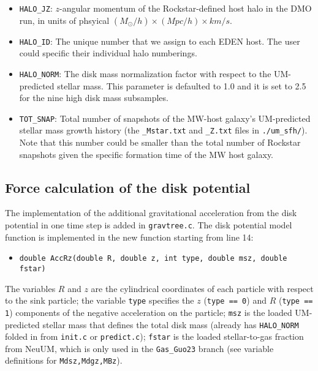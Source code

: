 \documentclass[12pt]{article}
\begin{document}
\begin{itemize}
        \item \texttt{HALO\_JZ}: $z$-angular momentum of the Rockstar-defined host halo in the DMO run, in units of phsyical $(M_{\odot}/h) \times (Mpc/h) \times km/s$.
        \item \texttt{HALO\_ID}: The unique number that we assign to each EDEN host. The user could specific their individual halo numberings.
        \item \texttt{HALO\_NORM}: The disk mass normalization factor with respect to the UM-predicted stellar mass. This parameter is defaulted to 1.0 and it is set to 2.5 for the nine high disk mass subsamples.
        \item \texttt{TOT\_SNAP}: Total number of snapshots of the MW-host galaxy's UM-predicted stellar mass growth history (the \texttt{\_Mstar.txt} and \texttt{\_Z.txt} files in \texttt{./um\_sfh/}). Note that this number could be smaller than the total number of Rockstar snapshots given the specific formation time of the MW host galaxy.
    \end{itemize}

    \subsection{Force calculation of the disk potential}

    The implementation of the additional gravitational acceleration from the disk potential in one time step is added in \texttt{gravtree.c}. The disk potential model function is implemented in the new function starting from line 14:
    \begin{itemize}
        \item \texttt{double AccRz(double R, double z, int type, double msz, double fstar)}
    \end{itemize}
    The variables $R$ and $z$ are the cylindrical coordinates of each particle with respect to the sink particle; the variable \texttt{type} specifies the $z$ (\texttt{type == 0}) and $R$ (\texttt{type == 1}) components of the negative acceleration on the particle; \texttt{msz} is the loaded UM-predicted stellar mass that defines the total disk mass (already has \texttt{HALO\_NORM} folded in from \texttt{init.c} or \texttt{predict.c}); \texttt{fstar} is the loaded stellar-to-gas fraction from NeuUM, which is only used in the \texttt{Gas\_Guo23} branch (see variable definitions for \texttt{Mdsz,Mdgz,MBz}).
\end{document}
